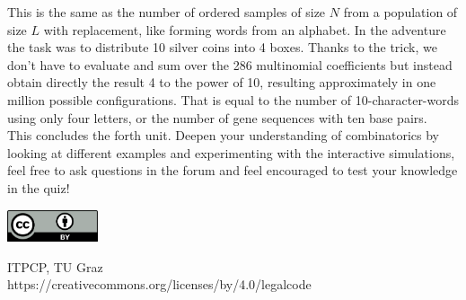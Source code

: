 \documentclass[12pt, a4paper]{scrartcl}
\begin{document}
This is the same as the number of ordered samples of size $N$ from a population of size $L$ with replacement, like forming words from an alphabet.
In the adventure the task was to distribute 10 silver coins into 4 boxes. Thanks to the trick, we don't have to evaluate and sum over the 286 multinomial coefficients but instead obtain directly the result 4 to the power of 10, resulting approximately in one million possible configurations.
That is equal to the number of 10-character-words using only four letters, 
or the number of gene sequences with ten base pairs.\\


This concludes the forth unit. Deepen your understanding of combinatorics by looking at different examples and experimenting with the interactive simulations, feel free to ask questions in the forum and feel encouraged to test your knowledge in the quiz!


\vspace{2cm}
\begin{minipage}[t]{1\textwidth}
	\raggedleft
	\centering
	\includegraphics[width = 0.20\textwidth]{CC-BY_icon}
	\vspace{0.2cm}
	
	\centering
	{\large ITPCP, TU Graz} \\
	https://creativecommons.org/licenses/by/4.0/legalcode
\end{minipage}
\end{document}
